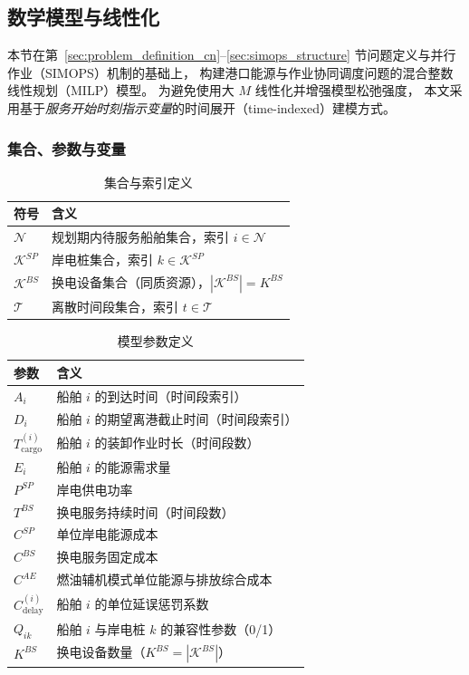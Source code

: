 \documentclass[UTF8, a4paper, 12pt]{ctexart}
\theoremstyle{plain}
\theoremstyle{definition}
\theoremstyle{remark}
\begin{document}
\subsection{数学模型与线性化}
\label{sec:model_formulation}

本节在第~\ref{sec:problem_definition_cn}--\ref{sec:simops_structure} 节问题定义与并行作业（SIMOPS）机制的基础上，
构建港口能源与作业协同调度问题的混合整数线性规划（MILP）模型。
为避免使用大 $M$ 线性化并增强模型松弛强度，
本文采用基于\emph{服务开始时刻指示变量}的时间展开（time-indexed）建模方式。
\subsubsection{集合、参数与变量}

\begin{table}[!htbp]
\centering
\caption{集合与索引定义}
\begin{tabular}{ll}
\toprule
符号 & 含义 \\
\midrule
$\mathcal{N}$ & 规划期内待服务船舶集合，索引 $i \in \mathcal{N}$ \\
$\mathcal{K}^{SP}$ & 岸电桩集合，索引 $k \in \mathcal{K}^{SP}$ \\
$\mathcal{K}^{BS}$ & 换电设备集合（同质资源），$|\mathcal{K}^{BS}| = K^{BS}$ \\
$\mathcal{T}$ & 离散时间段集合，索引 $t \in \mathcal{T}$ \\
\bottomrule
\end{tabular}
\end{table}


\begin{table}[!htbp]
\centering
\caption{模型参数定义}
\begin{tabular}{ll}
\toprule
参数 & 含义 \\
\midrule
$A_i$ & 船舶 $i$ 的到达时间（时间段索引） \\
$D_i$ & 船舶 $i$ 的期望离港截止时间（时间段索引） \\
$T^{(i)}_{\text{cargo}}$ & 船舶 $i$ 的装卸作业时长（时间段数） \\
$E_i$ & 船舶 $i$ 的能源需求量 \\
$P^{SP}$ & 岸电供电功率 \\
$T^{BS}$ & 换电服务持续时间（时间段数） \\
$C^{SP}$ & 单位岸电能源成本 \\
$C^{BS}$ & 换电服务固定成本 \\
$C^{AE}$ & 燃油辅机模式单位能源与排放综合成本 \\
$C^{(i)}_{\text{delay}}$ & 船舶 $i$ 的单位延误惩罚系数 \\
$Q_{ik}$ & 船舶 $i$ 与岸电桩 $k$ 的兼容性参数（0/1） \\
$K^{BS}$ & 换电设备数量（$K^{BS}=|\mathcal{K}^{BS}|$） \\
\bottomrule
\end{tabular}
\end{table}
\end{document}
